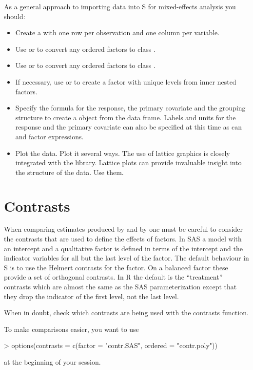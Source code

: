 \documentclass[12pt]{article}
\newcommand{\s}{\textsf{S}}
\newcommand{\R}{\textsf{R}}
\begin{document}
As a general approach to importing data into \s{} for mixed-effects
analysis you should:
\begin{itemize}
\item Create a  with one row per observation and one
  column per variable.
\item Use  or  to convert any
  ordered factors to class .
\item Use  or  to convert any
  ordered factors to class .
\item If necessary, use  or \code{:} to create a factor with unique
  levels from inner nested factors.
\item Specify the formula for the response, the primary covariate and
  the grouping structure to create a  object from the
  data frame.  Labels and units for the response and the primary
  covariate can also be specified at this time as can  and
   factor expressions.
\item Plot the data.  Plot it several ways.  The use of lattice
  graphics is closely integrated with the  library.
  Lattice plots can provide invaluable insight into the structure of
  the data.  Use them.
\end{itemize}

\section{Contrasts}
\label{sec:contrasts}

When comparing estimates produced by  and by
 one must be careful to consider the contrasts that are
used to define the effects of factors.  In \textsf{SAS} a model with
an intercept and a qualitative factor is defined in terms of the
intercept and the indicator variables for all but the last level of
the factor.  The default behaviour in \s{} is to use the Helmert
contrasts for the factor.  On a balanced factor these provide a set of 
orthogonal contrasts.  In \R{} the default is the ``treatment''
contrasts which are almost the same as the SAS parameterization except 
that they drop the indicator of the first level, not the last level.

When in doubt, check which contrasts are being used with the
\textsf{contrasts} function.

To make comparisons easier, you want to use
\begin{Schunk}
\begin{Sinput}
> options(contrasts = c(factor = "contr.SAS", ordered = "contr.poly"))
\end{Sinput}
\end{Schunk}
at the beginning of your session.
\end{document}
